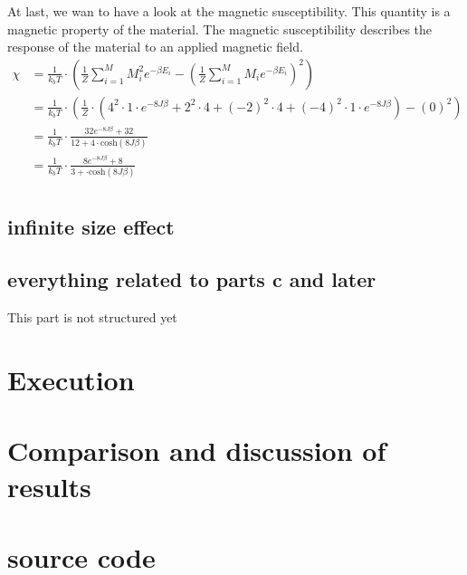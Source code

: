 \documentclass[10pt,a4paper]{article}
\begin{document}
At last, we wan to have a look at the magnetic susceptibility. This quantity is a magnetic property of the material. The magnetic susceptibility describes the response of the material to an applied magnetic field. 
\begin{align}
\chi &= \frac{1}{k_b T} \cdot \left( \frac{1}{Z} \sum_{i=1}^{M} M_i^2 e^{- \beta E_i } - \left( \frac{1}{Z} \sum_{i=1}^{M} M_i e^{- \beta E_i }  \right)^2 \right)\\
&= \frac{1}{k_b T} \cdot \left( \frac{1}{Z} \cdot \left( 4^2 \cdot 1 \cdot e^{-8J\beta}+ 2^2 \cdot 4+(-2)^2 \cdot 4 + (-4)^2 \cdot 1 \cdot e^{-8J \beta } \right) - \left( 0  \right)^2 \right)\\
&= \frac{1}{k_b T} \cdot \frac{32 e^{-8J\beta}+32}{ 12+ 4 \cdot \mathrm{cosh} \left( 8J \beta \right)}\\
&= \frac{1}{k_b T} \cdot \frac{8 e^{-8J\beta}+8}{ 3+ \cdot \mathrm{cosh} \left( 8J \beta \right)}\\
\end{align}

\subsection{infinite size effect}
\subsection{everything related to parts c and later}

This part is not structured yet
\section{Execution}

\section{Comparison and discussion of results}

\section{source code}
\end{document}
